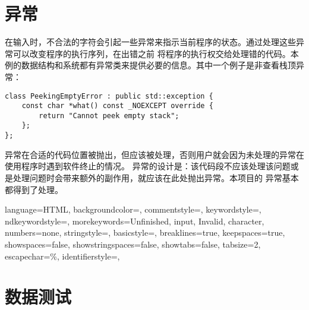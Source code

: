 
\chapter{异常}
在输入时，不合法的字符会引起一些异常来指示当前程序的状态。通过处理这些异常可以改变程序的执行序列，在出错之前%
将程序的执行权交给处理错的代码。本例的数据结构和系统都有异常类来提供必要的信息。其中一个例子是非查看栈顶异常：
\begin{lstlisting}[firstnumber=244, caption=NaNException 异常类]
class PeekingEmptyError : public std::exception {
    const char *what() const _NOEXCEPT override {
        return "Cannot peek empty stack";
    };
};
\end{lstlisting}

异常在合适的代码位置被抛出，但应该被处理，否则用户就会因为未处理的异常在使用程序时遇到软件终止的情况。%
异常的设计是：该代码段不应该处理该问题或是处理问题时会带来额外的副作用，就应该在此处抛出异常。本项目的%
异常基本都得到了处理。


 {
    language=HTML,
    backgroundcolor=\color{CPPDark},   
    commentstyle=\color{CPPLight},
    keywordstyle=\color{red},
    ndkeywordstyle={},
    morekeywords={Unfinished, input, Invalid, character},
    numbers=none,
    stringstyle={},
    basicstyle=\fira\color{white}\footnotesize,
    breaklines=true,                                     
    keepspaces=true,                                     
    showspaces=false,                
    showstringspaces=false,
    showtabs=false,                  
    tabsize=2,
    escapechar=\%,
    identifierstyle={},
}

\chapter{数据测试}

